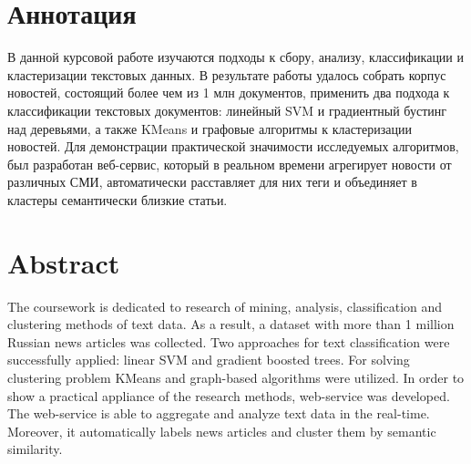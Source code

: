 \titleformat{\section}[block]
{\centering\fontsize{16pt}{18pt}\selectfont\bfseries}{\thesection\cftsecaftersnum}{0.5em}{} %

\section*{Аннотация}
В данной курсовой работе изучаются подходы к сбору, анализу, классификации и кластеризации текстовых данных.
В результате работы удалось собрать корпус новостей, состоящий более чем из 1 млн документов, применить
два подхода к классификации текстовых документов: линейный SVM и градиентный бустинг над деревьями,
а также KMeans и графовые алгоритмы к кластеризации новостей. Для демонстрации практической значимости исследуемых алгоритмов, был разработан 
веб-сервис, который в реальном времени агрегирует новости от различных СМИ, автоматически расставляет для них теги и объединяет в кластеры 
семантически близкие статьи.

\section*{Abstract}
The coursework is dedicated to research of mining, analysis, classification and clustering methods of text data.
As a result, a dataset with more than 1 million Russian news articles was collected. Two approaches for text classification were successfully 
applied: linear SVM and gradient boosted trees. For solving clustering problem KMeans and graph-based algorithms were utilized. In order to show a 
practical  appliance of the research methods, web-service was developed.
The web-service is able to aggregate and analyze text data in the real-time. Moreover, it automatically labels news articles
and cluster them by semantic similarity.

\titleformat{\section}[block]
{\raggedright\fontsize{16pt}{18pt}\selectfont\bfseries}{\thesection\cftsecaftersnum}{0.5em}{} %